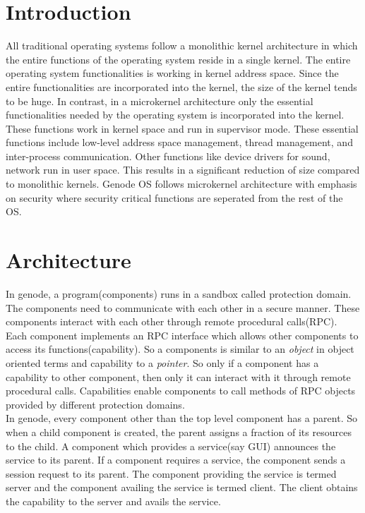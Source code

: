 \documentclass[12pt]{article}
\theoremstyle{plain}
\begin{document}
\section*{Introduction}
All traditional operating systems follow a monolithic kernel architecture in which the entire functions of the operating system reside in a single kernel. The entire operating system functionalities is working in kernel address space. Since the entire functionalities are incorporated into the kernel, the size of the kernel tends to be huge. In contrast, in a  microkernel architecture only the essential functionalities needed by the operating system is incorporated into the kernel. These functions work in kernel space and run in supervisor mode. These essential functions include  low-level address space management, thread management, and inter-process communication. Other functions like device drivers for sound, network run in user space. This results in a significant reduction of size compared to monolithic kernels. Genode OS follows microkernel architecture with emphasis on security where security critical functions are seperated from the rest of the OS. 
\section*{Architecture}
In genode, a program(components) runs in a sandbox called protection domain. The components need to communicate with each other in a secure manner. These components interact with each other through remote procedural calls(RPC). Each component implements an RPC interface which allows other components to access its functions(capability). So a components is similar to an \textit{object} in object oriented terms and capability to a \textit{pointer}. So only if a component has a capability to other component, then only it can interact with it through remote procedural calls. Capabilities enable components to call methods of RPC objects provided by different
protection domains.
\\
In genode, every component other than the top level component has a parent. So when a child component is created, the parent assigns a fraction of its resources to the child. A component which provides a service(say GUI) announces the service to its parent. If a component requires a service, the component sends a session request to its parent. The component providing the service is termed server and the component availing the service is termed client. The client obtains the capability to the server and avails the service.
\end{document}
